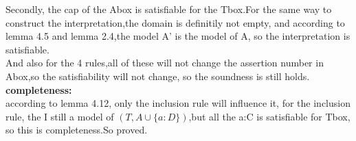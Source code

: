 \documentclass{article}
\begin{document}
    Secondly, the cap of the Abox is satisfiable for the Tbox.For the same way to construct the interpretation,the domain is definitily not empty, and according to lemma 4.5 and lemma 2.4,the model A' is the model of A, so the interpretation is satisfiable.\\
    And also for the 4 rules,all of these will not change the assertion number in Abox,so the satisfiability will not change, so the soundness is still holds.\\
    \textbf{completeness:}\\
    according to lemma 4.12, only the inclusion rule will influence it, for the inclusion rule, the I still a model of $(T,A\cup \{a:D\})$,but all the a:C is satisfiable for Tbox, so this is completeness.So proved.\\
\end{document}
